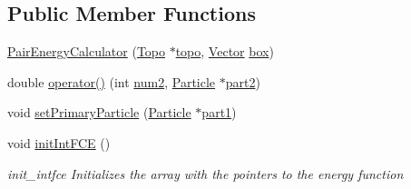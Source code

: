 \subsection*{Public Member Functions}
\begin{DoxyCompactItemize}
\item 
\hyperlink{class_pair_energy_calculator_a93de4db8e4fc6c4ca07a056e979eba45}{Pair\+Energy\+Calculator} (\hyperlink{class_topo}{Topo} $\ast$\hyperlink{class_pair_energy_calculator_a89462e46d51f1247121a58a71831d2a2}{topo}, \hyperlink{class_vector}{Vector} \hyperlink{class_pair_energy_calculator_a4c8925567dcb6e14f832a13474486d57}{box})
\item 
double \hyperlink{class_pair_energy_calculator_ac03c8733c369cf005967fe77df01ac4d}{operator()} (int \hyperlink{class_pair_energy_calculator_a437c68a040fd7eb9f261bc2c22cf3bcf}{num2}, \hyperlink{class_particle}{Particle} $\ast$\hyperlink{class_pair_energy_calculator_a5930e66e7a0e9c3b2bd7e76391854ad2}{part2})
\item 
void \hyperlink{class_pair_energy_calculator_ab47bfdf5e4c46f750a97192d366f58c5}{set\+Primary\+Particle} (\hyperlink{class_particle}{Particle} $\ast$\hyperlink{class_pair_energy_calculator_a168122b4b21b48d25093a9e314045929}{part1})
\item 
void \hyperlink{class_pair_energy_calculator_ad6cd85c8a59e2747e491e2478ad274e1}{init\+Int\+F\+C\+E} ()
\begin{DoxyCompactList}\small\item\em init\+\_\+intfce Initializes the array with the pointers to the energy function \end{DoxyCompactList}\end{DoxyCompactItemize}
